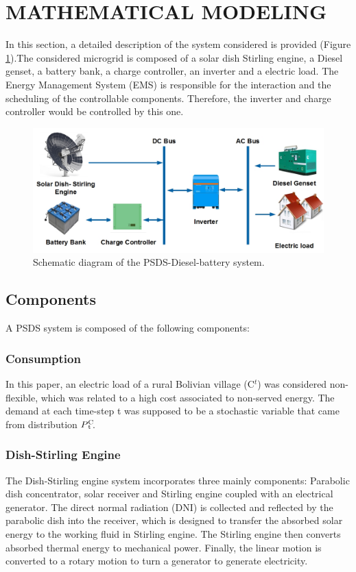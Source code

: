 \documentclass{ECOS_2019}
\begin{document}
\section{MATHEMATICAL MODELING}
In this section, a detailed description of the system considered is provided (Figure \ref{fig_configuration}).The considered microgrid is composed of a solar dish Stirling engine, a Diesel genset, a battery bank, a charge controller, an inverter and a electric load. The Energy Management System (EMS) is responsible for the interaction and the scheduling of the controllable components. Therefore, the inverter and charge controller would be controlled by this one.
\begin{figure}[h!]
    \centering
    \includegraphics[scale=0.565]{Figures/Dish_Stirling_Configuration.jpg}
    \caption{Schematic diagram of the PSDS-Diesel-battery system.}
    \label{fig_configuration}
\end{figure}
\subsection{Components}
A PSDS system is composed of the following components:
\subsubsection{Consumption}
In this paper, an electric load of a rural Bolivian village (C$^{t}$) was considered non-flexible, which was related to a high cost associated to non-served energy. The demand at each time-step t was supposed to be a stochastic variable that came from distribution {$P\rlap{\textsuperscript{C}}\textsubscript{t}$}\cite{Totaro2021}.
\subsubsection{Dish-Stirling Engine}
The Dish-Stirling engine system incorporates three mainly components: Parabolic dish concentrator, solar receiver and Stirling engine coupled with an electrical generator. The direct normal radiation (DNI) is collected and reflected by the parabolic dish into the receiver, which is designed to transfer the absorbed solar energy to the working fluid in Stirling engine. The Stirling engine then converts absorbed thermal energy to mechanical power. Finally, the linear motion is converted to a rotary motion to turn a generator to generate electricity.
\end{document}

